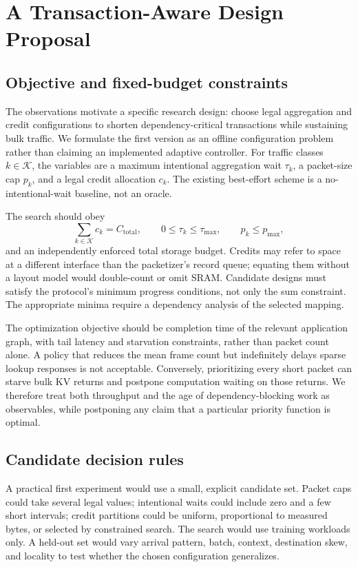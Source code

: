 \section{A Transaction-Aware Design Proposal}
\subsection{Objective and fixed-budget constraints}
The observations motivate a specific research design: choose legal aggregation and credit configurations to shorten dependency-critical transactions while sustaining bulk traffic. We formulate the first version as an offline configuration problem rather than claiming an implemented adaptive controller. For traffic classes $k\in\mathcal K$, the variables are a maximum intentional aggregation wait $\tau_k$, a packet-size cap $p_k$, and a legal credit allocation $c_k$. The existing best-effort scheme is a no-intentional-wait baseline, not an oracle.

The search should obey
\begin{equation}
 \sum_{k\in\mathcal K}c_k=C_{\mathrm{total}},\qquad
 0\leq\tau_k\leq\tau_{\max},\qquad
 p_k\leq p_{\max},
\end{equation}
and an independently enforced total storage budget. Credits may refer to space at a different interface than the packetizer's record queue; equating them without a layout model would double-count or omit SRAM. Candidate designs must satisfy the protocol's minimum progress conditions, not only the sum constraint. The appropriate minima require a dependency analysis of the selected mapping.

The optimization objective should be completion time of the relevant application graph, with tail latency and starvation constraints, rather than packet count alone. A policy that reduces the mean frame count but indefinitely delays sparse lookup responses is not acceptable. Conversely, prioritizing every short packet can starve bulk KV returns and postpone computation waiting on those returns. We therefore treat both throughput and the age of dependency-blocking work as observables, while postponing any claim that a particular priority function is optimal.

\subsection{Candidate decision rules}
A practical first experiment would use a small, explicit candidate set. Packet caps could take several legal values; intentional waits could include zero and a few short intervals; credit partitions could be uniform, proportional to measured bytes, or selected by constrained search. The search would use training workloads only. A held-out set would vary arrival pattern, batch, context, destination skew, and locality to test whether the chosen configuration generalizes.

